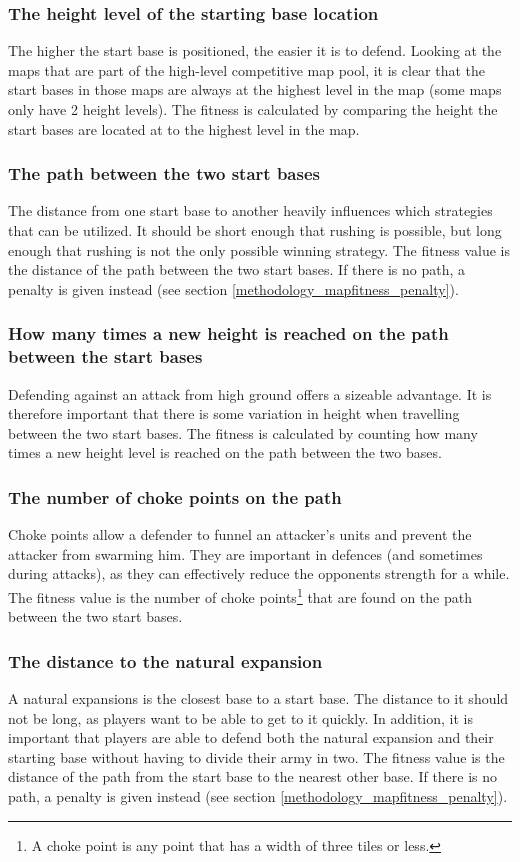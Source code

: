 	\subsubsection*{The height level of the starting base location}
	The higher the start base is positioned, the easier it is to defend. Looking at the maps that are part of the high-level competitive map pool, it is clear that the start bases in those maps are always at the highest level in the map (some maps only have 2 height levels). The fitness is calculated by comparing the height the start bases are located at to the highest level in the map. 

	\subsubsection*{The path between the two start bases}
	The distance from one start base to another heavily influences which strategies that can be utilized. It should be short enough that rushing is possible, but long enough that rushing is not the only possible winning strategy. The fitness value is the distance of the path between the two start bases. If there is no path, a penalty is given instead (see section \ref{methodology_mapfitness_penalty}).

	\subsubsection*{How many times a new height is reached on the path between the start bases}
	Defending against an attack from high ground offers a sizeable advantage. It is therefore important that there is some variation in height when travelling between the two start bases. The fitness is calculated by counting how many times a new height level is reached on the path between the two bases.

	\subsubsection*{The number of choke points on the path}
	Choke points allow a defender to funnel an attacker's units and prevent the attacker from swarming him. They are important in defences (and sometimes during attacks), as they can effectively reduce the opponents strength for a while. The fitness value is the number of choke points\footnote{A choke point is any point that has a width of three tiles or less.} that are found on the path between the two start bases.

	\subsubsection*{The distance to the natural expansion}
	A natural expansions is the closest base to a start base. The distance to it should not be long, as players want to be able to get to it quickly. In addition, it is important that players are able to defend both the natural expansion and their starting base without having to divide their army in two. The fitness value is the distance of the path from the start base to the nearest other base. If there is no path, a penalty is given instead (see section \ref{methodology_mapfitness_penalty}).

